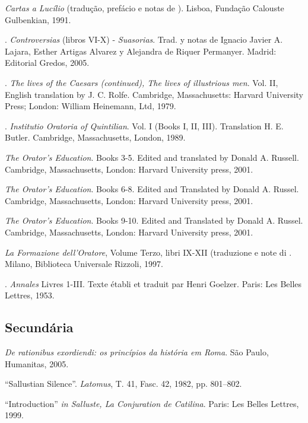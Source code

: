 \begin{bibliohedra}
 \emph{Cartas a Lucílio} (tradução, prefácio e notas de ). Lisboa, Fundação Calouste Gulbenkian, 1991.

. \emph{Controversias} (libros VI-X) - \emph{Suasorias}. Trad. y notas de Ignacio Javier A. Lajara, Esther Artigas Alvarez y Alejandra de Riquer Permanyer. Madrid: Editorial Gredos, 2005. 

. \emph{The lives of the Caesars (continued), The lives of illustrious men}. Vol. II, English translation by J. C. Rolfe. Cambridge, Massachusetts: Harvard University Press; London: William Heinemann, Ltd, 1979.

. \emph{Institutio Oratoria of Quintilian}. Vol. I (Books I, II, III). Translation H. E. Butler. Cambridge, Massachusetts, London, 1989.

\titidem \emph{The Orator’s Education}. Books 3-5. Edited and translated by Donald A. Russell. Cambridge, Massachusetts, London: Harvard University press, 2001.

\titidem \emph{The Orator’s Education}. Books 6-8. Edited and Translated by Donald A. Russel. Cambridge, Massachusetts, London: Harvard University press, 2001.


\titidem \emph{The Orator’s Education}. Books 9-10. Edited and Translated by Donald A. Russel. Cambridge, Massachusetts, London: Harvard University press, 2001.

 \emph{La Formazione dell’Oratore}, Volume Terzo, libri IX-XII (traduzione e note di . Milano, Biblioteca Universale Rizzoli, 1997.


.  \emph{Annales} Livres 1-III. Texte établi et traduit par Henri Goelzer. Paris: Les Belles Lettres, 1953. 



\subsection{Secundária}



 \emph{De rationibus exordiendi: os princípios da história em Roma}. São Paulo, Humanitas, 2005.



 ``Sallustian Silence”. \emph{Latomus}, T. 41, Fasc. 42, 1982, pp. 801–802.



 ``Introduction'' \emph{in Salluste, La Conjuration de Catilina}. Paris: Les Belles Lettres, 1999.  


\end{bibliohedra}
